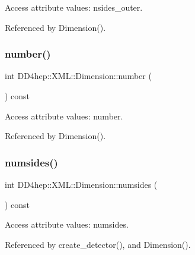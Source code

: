 Access attribute values\+: nsides\+\_\+outer. 



Referenced by Dimension().

\hypertarget{struct_d_d4hep_1_1_x_m_l_1_1_dimension_a3130e131f0fca55ce5448bd89a358477}{}\label{struct_d_d4hep_1_1_x_m_l_1_1_dimension_a3130e131f0fca55ce5448bd89a358477} 
\subsubsection{\texorpdfstring{number()}{number()}}
{\footnotesize\ttfamily int D\+D4hep\+::\+X\+M\+L\+::\+Dimension\+::number (\begin{DoxyParamCaption}{ }\end{DoxyParamCaption}) const}



Access attribute values\+: number. 



Referenced by Dimension().

\hypertarget{struct_d_d4hep_1_1_x_m_l_1_1_dimension_afbf7151c9900dd453d2c634e35a0c90e}{}\label{struct_d_d4hep_1_1_x_m_l_1_1_dimension_afbf7151c9900dd453d2c634e35a0c90e} 
\subsubsection{\texorpdfstring{numsides()}{numsides()}}
{\footnotesize\ttfamily int D\+D4hep\+::\+X\+M\+L\+::\+Dimension\+::numsides (\begin{DoxyParamCaption}{ }\end{DoxyParamCaption}) const}



Access attribute values\+: numsides. 



Referenced by create\+\_\+detector(), and Dimension().

\hypertarget{struct_d_d4hep_1_1_x_m_l_1_1_dimension_ad2d2ed9996c11cca8b9a722da31c05d6}{}\label{struct_d_d4hep_1_1_x_m_l_1_1_dimension_ad2d2ed9996c11cca8b9a722da31c05d6} 
